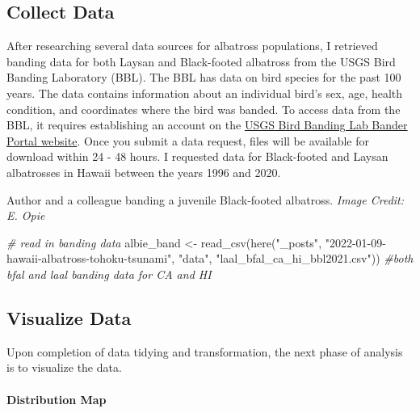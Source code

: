 \documentclass[
]{article}
\newenvironment{Shaded}{\begin{snugshade}}{\end{snugshade}}
\newcommand{\CommentTok}[1]{\textcolor[rgb]{0.56,0.35,0.01}{\textit{#1}}}
\newcommand{\FunctionTok}[1]{\textcolor[rgb]{0.00,0.00,0.00}{#1}}
\newcommand{\NormalTok}[1]{#1}
\newcommand{\OtherTok}[1]{\textcolor[rgb]{0.56,0.35,0.01}{#1}}
\newcommand{\StringTok}[1]{\textcolor[rgb]{0.31,0.60,0.02}{#1}}
\begin{document}
\hypertarget{collect-data}{%
\subsection{Collect Data}\label{collect-data}}

After researching several data sources for albatross populations, I
retrieved banding data for both Laysan and Black-footed albatross from
the USGS Bird Banding Laboratory (BBL). The BBL has data on bird species
for the past 100 years. The data contains information about an
individual bird's sex, age, health condition, and coordinates where the
bird was banded. To access data from the BBL, it requires establishing
an account on the
\href{https://www.pwrc.usgs.gov/bbl/Bander_portal/login/main_login.php}{USGS
Bird Banding Lab Bander Portal website}. Once you submit a data request,
files will be available for download within 24 - 48 hours. I requested
data for Black-footed and Laysan albatrosses in Hawaii between the years
1996 and 2020.

Author and a colleague banding a juvenile Black-footed albatross.
\emph{Image Credit: E. Opie}

\begin{Shaded}
\begin{Highlighting}[]
\CommentTok{\# read in banding data}
\NormalTok{albie\_band }\OtherTok{\textless{}{-}} \FunctionTok{read\_csv}\NormalTok{(}\FunctionTok{here}\NormalTok{(}\StringTok{"\_posts"}\NormalTok{, }\StringTok{"2022{-}01{-}09{-}hawaii{-}albatross{-}tohoku{-}tsunami"}\NormalTok{, }\StringTok{"data"}\NormalTok{, }\StringTok{"laal\_bfal\_ca\_hi\_bbl2021.csv"}\NormalTok{)) }\CommentTok{\#both bfal and laal banding data for CA and HI}
\end{Highlighting}
\end{Shaded}

\hypertarget{visualize-data}{%
\subsection{Visualize Data}\label{visualize-data}}

Upon completion of data tidying and transformation, the next phase of
analysis is to visualize the data.

\hypertarget{distribution-map}{%
\paragraph{Distribution Map}\label{distribution-map}}
\end{document}
